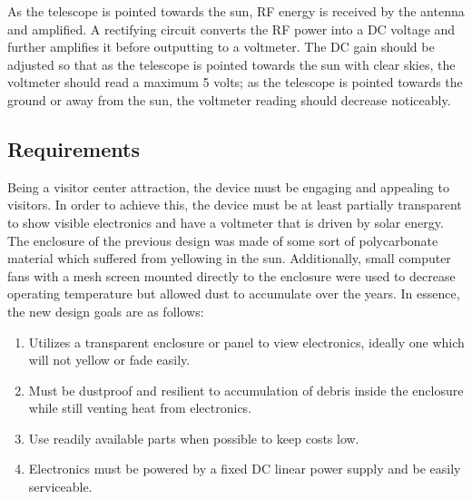 \documentclass[titlepage]{article}
\begin{document}
As the telescope is pointed towards the sun, RF energy is received by the antenna and amplified. A rectifying circuit converts the RF power into a DC voltage and further amplifies it before outputting to a voltmeter. The DC gain should be adjusted so that as the telescope is pointed towards the sun with clear skies, the voltmeter should read a maximum 5 volts; as the telescope is pointed towards the ground or away from the sun, the voltmeter reading should decrease noticeably.

\subsection{Requirements}
Being a visitor center attraction, the device must be engaging and appealing to visitors. In order to achieve this, the device must be at least partially transparent to show visible electronics and have a voltmeter that is driven by solar energy. The enclosure of the previous design was made of some sort of polycarbonate material which suffered from yellowing in the sun. Additionally, small computer fans with a mesh screen mounted directly to the enclosure were used to decrease operating temperature but allowed dust to accumulate over the years. In essence, the new design goals are as follows:
\begin{enumerate}
    \item Utilizes a transparent enclosure or panel to view electronics, ideally one which will not yellow or fade easily.
    \item Must be dustproof and resilient to accumulation of debris inside the enclosure while still venting heat from electronics.
    \item Use readily available parts when possible to keep costs low.
    \item Electronics must be powered by a fixed DC linear power supply and be easily serviceable.
\end{enumerate}
\end{document}
